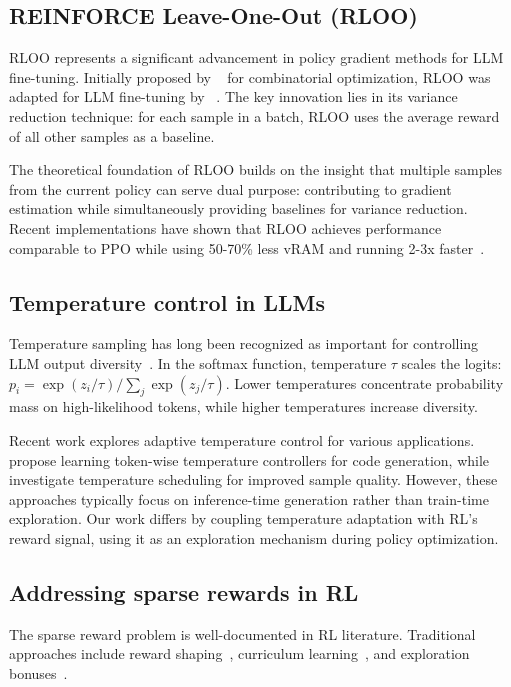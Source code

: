 \documentclass{article}
\begin{document}
\subsection{REINFORCE Leave-One-Out (RLOO)}

RLOO represents a significant advancement in policy gradient methods for LLM fine-tuning. Initially proposed by ~\cite{kool2019buy} for combinatorial optimization, RLOO was adapted for LLM fine-tuning by ~\cite{ahmadian2024back}. The key innovation lies in its variance reduction technique: for each sample in a batch, RLOO uses the average reward of all other samples as a baseline.

The theoretical foundation of RLOO builds on the insight that multiple samples from the current policy can serve dual purpose: contributing to gradient estimation while simultaneously providing baselines for variance reduction. Recent implementations have shown that RLOO achieves performance comparable to PPO while using 50-70\% less vRAM and running 2-3x faster~\cite{huang2024putting}.

\subsection{Temperature control in LLMs}

Temperature sampling has long been recognized as important for controlling LLM output diversity~\cite{graves2013generating}. In the softmax function, temperature $\tau$ scales the logits: $p_i = \exp(z_i/\tau) / \sum_j \exp(z_j/\tau)$. Lower temperatures concentrate probability mass on high-likelihood tokens, while higher temperatures increase diversity.

Recent work explores adaptive temperature control for various applications. ~\cite{zhu2024hot} propose learning token-wise temperature controllers for code generation, while \cite{renze2024effect} investigate temperature scheduling for improved sample quality. However, these approaches typically focus on inference-time generation rather than train-time exploration. Our work differs by coupling temperature adaptation with RL's reward signal, using it as an exploration mechanism during policy optimization.

\subsection{Addressing sparse rewards in RL}

The sparse reward problem is well-documented in RL literature. Traditional approaches include reward shaping~\cite{ng1999policy}, curriculum learning~\cite{bengio2009curriculum}, and exploration bonuses~\cite{bellemare2016unifying}. 
\end{document}

